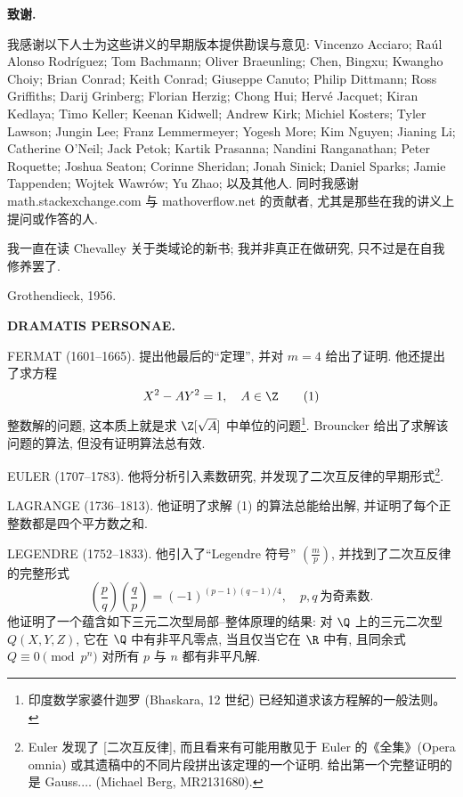 \par\medskip\noindent\textbf{致谢.}\enspace

我感谢以下人士为这些讲义的早期版本提供勘误与意见: Vincenzo Acciaro; Ra\'ul Alonso Rodr\'iguez; Tom Bachmann; Oliver Braeunling; Chen, Bingxu; Kwangho Choiy; Brian Conrad; Keith Conrad; Giuseppe Canuto; Philip Dittmann; Ross Griffiths; Darij Grinberg; Florian Herzig; Chong Hui; Herv\'e Jacquet; Kiran Kedlaya; Timo Keller; Keenan Kidwell; Andrew Kirk; Michiel Kosters; Tyler Lawson; Jungin Lee; Franz Lemmermeyer; Yogesh More; Kim Nguyen; Jianing Li; Catherine O'Neil; Jack Petok; Kartik Prasanna; Nandini Ranganathan; Peter Roquette; Joshua Seaton; Corinne Sheridan; Jonah Sinick; Daniel Sparks; Jamie Tappenden; Wojtek Wawr\'ow; Yu Zhao; 以及其他人. 同时我感谢 math.stackexchange.com 与 mathoverflow.net 的贡献者, 尤其是那些在我的讲义上提问或作答的人.

我一直在读 Chevalley 关于类域论的新书; 我并非真正在做研究, 只不过是在自我修养罢了.\par\noindent Grothendieck, 1956.
\endgroup

\clearpage
\noindent\textbf{DRAMATIS PERSONAE.}

FERMAT (1601--1665). 提出他最后的``定理'', 并对 $m = 4$ 给出了证明. 他还提出了求方程
\begin{equation*}
X^{2} - AY^{2} = 1, \quad A \in \Z
\tag{1}
\end{equation*}
整数解的问题, 这本质上就是求 $\Z[\sqrt{A}]$ 中单位的问题\footnote{印度数学家婆什迦罗 (Bhaskara, 12 世纪) 已经知道求该方程解的一般法则。}. Brouncker 给出了求解该问题的算法, 但没有证明算法总有效.

EULER (1707--1783). 他将分析引入素数研究, 并发现了二次互反律的早期形式\footnote{Euler 发现了 [二次互反律], 而且看来有可能用散见于 Euler 的《全集》(Opera omnia) 或其遗稿中的不同片段拼出该定理的一个证明. 给出第一个完整证明的是 Gauss.$\ldots$ (Michael Berg, MR2131680).}.

LAGRANGE (1736--1813). 他证明了求解 (1) 的算法总能给出解, 并证明了每个正整数都是四个平方数之和.

LEGENDRE (1752--1833). 他引入了``Legendre 符号'' $\left(\frac{m}{p}\right)$, 并找到了二次互反律的完整形式
\[
\left(\frac{p}{q}\right)\left(\frac{q}{p}\right) = (-1)^{(p-1)(q-1)/4}, \quad p, q\ \text{为奇素数}.
\]
他证明了一个蕴含如下三元二次型局部--整体原理的结果: 对 $\Q$ 上的三元二次型 $Q(X, Y, Z)$, 它在 $\Q$ 中有非平凡零点, 当且仅当它在 $\R$ 中有, 且同余式 $Q \equiv 0 \pmod{p^{n}}$ 对所有 $p$ 与 $n$ 都有非平凡解.

